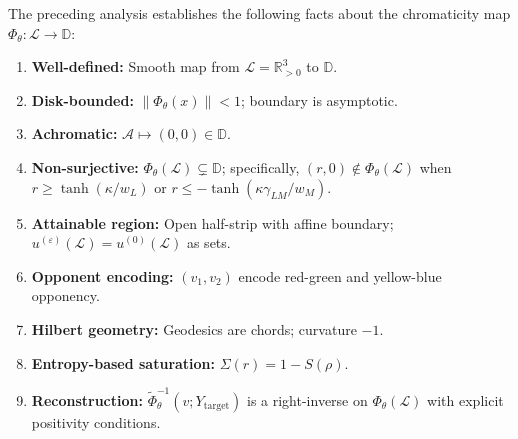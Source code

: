 \documentclass[11pt]{article}
\theoremstyle{plain}
\theoremstyle{definition}
\theoremstyle{remark}
\newcommand{\Rpp}{\mathbb{R}_{> 0}}     %
\newcommand{\D}{\mathbb{D}}
\newcommand{\norm}[1]{\left\lVert #1 \right\rVert}
\newcommand{\Tr}{\mathrm{Tr}}
\DeclareMathOperator{\arctanh}{arctanh}
\DeclareMathOperator{\arcosh}{arcosh}
\begin{document}
The preceding analysis establishes the following facts about the chromaticity map $\Phi_\theta: \mathcal{L} \to \D$:
\begin{enumerate}[label=(\arabic*)]
    \item \textbf{Well-defined:} Smooth map from $\mathcal{L} = \Rpp^3$ to $\D$.
    \item \textbf{Disk-bounded:} $\norm{\Phi_\theta(x)} < 1$; boundary is asymptotic.
    \item \textbf{Achromatic:} $\mathcal{A} \mapsto (0,0) \in \D$.
    \item \textbf{Non-surjective:} $\Phi_\theta(\mathcal{L}) \subsetneq \D$; specifically, $(r, 0) \notin \Phi_\theta(\mathcal{L})$ when $r \geq \tanh(\kappa/w_L)$ or $r \leq -\tanh(\kappa\gamma_{LM}/w_M)$.
    \item \textbf{Attainable region:} Open half-strip with affine boundary; $u^{(\varepsilon)}(\mathcal{L}) = u^{(0)}(\mathcal{L})$ as sets.
    \item \textbf{Opponent encoding:} $(v_1, v_2)$ encode red-green and yellow-blue opponency.
    \item \textbf{Hilbert geometry:} Geodesics are chords; curvature $-1$.
    \item \textbf{Entropy-based saturation:} $\Sigma(r) = 1 - S(\rho)$.
    \item \textbf{Reconstruction:} $\widetilde{\Phi}_\theta^{-1}(v; Y_{\mathrm{target}})$ is a right-inverse on $\Phi_\theta(\mathcal{L})$ with explicit positivity conditions.
\end{enumerate}




\graphicspath{{chromabloch/examples/}{chromabloch/results/}{chromabloch/results/publishable_run/}{examples/}{results/}{results/publishable_run/}}

\end{document}
